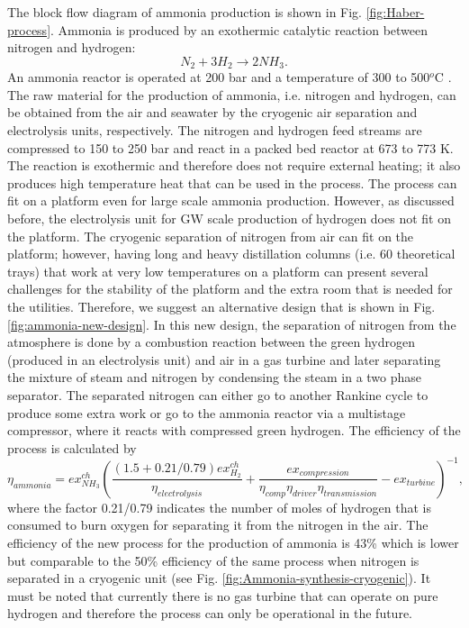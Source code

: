 \documentclass{ECOS_2021}
\begin{document}
The block flow diagram of ammonia production is shown in Fig. \ref{fig:Haber-process}.
Ammonia is produced by an exothermic catalytic reaction between nitrogen
and hydrogen:
\[
N_{2}+3H_{2}\rightarrow2NH_{3}.
\]
An ammonia reactor is operated at 200 bar and a temperature of 300
to 500$^{o}$C \cite{elnashaieSimulationOptimizationIndustrial1988,morudAnalysisInstabilityIndustrial1998}.
The raw material for the production of ammonia, i.e. nitrogen and
hydrogen, can be obtained from the air and seawater by the cryogenic
air separation and electrolysis units, respectively. The nitrogen
and hydrogen feed streams are compressed to 150 to 250 bar and react
in a packed bed reactor at 673 to 773 K. The reaction is exothermic
and therefore does not require external heating; it also produces
high temperature heat that can be used in the process. The process
can fit on a platform even for large scale ammonia production. However,
as discussed before, the electrolysis unit for GW scale production
of hydrogen does not fit on the platform. The cryogenic separation
of nitrogen from air can fit on the platform; however, having long
and heavy distillation columns (i.e. 60 theoretical trays) that work
at very low temperatures on a platform can present several challenges
for the stability of the platform and the extra room that is needed
for the utilities. Therefore, we suggest an alternative design that
is shown in Fig. \ref{fig:ammonia-new-design}. In this new design,
the separation of nitrogen from the atmosphere is done by a combustion
reaction between the green hydrogen (produced in an electrolysis unit)
and air in a gas turbine and later separating the mixture of steam
and nitrogen by condensing the steam in a two phase separator. The
separated nitrogen can either go to another Rankine cycle to produce
some extra work or go to the ammonia reactor via a multistage compressor,
where it reacts with compressed green hydrogen. The efficiency of
the process is calculated by
\[
\eta_{ammonia}=ex_{NH_{3}}^{ch}\left(\frac{\left(1.5+0.21/0.79\right)ex_{H_{2}}^{ch}}{\eta_{electrolysis}}+\frac{ex_{compression}}{\eta_{comp}\eta_{driver}\eta_{transmission}}-ex_{turbine}\right)^{-1},
\]
where the factor 0.21/0.79 indicates the number of moles of hydrogen
that is consumed to burn oxygen for separating it from the nitrogen
in the air. The efficiency of the new process for the production of
ammonia is 43\% which is lower but comparable to the 50\% efficiency
of the same process when nitrogen is separated in a cryogenic unit
(see Fig. \ref{fig:Ammonia-synthesis-cryogenic}). It must be noted
that currently there is no gas turbine that can operate on pure hydrogen
and therefore the process can only be operational in the future.
\end{document}
